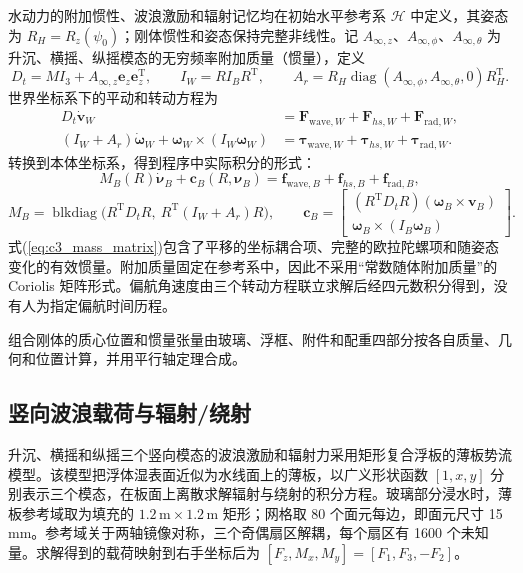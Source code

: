水动力的附加惯性、波浪激励和辐射记忆均在初始水平参考系 $\mathcal H$ 中定义，其姿态为 $R_H=R_z(\psi_0)$；刚体惯性和姿态保持完整非线性。记 $A_{\infty,z}$、$A_{\infty,\phi}$、$A_{\infty,\theta}$ 为升沉、横摇、纵摇模态的无穷频率附加质量（惯量），定义
\begin{equation}
D_t=MI_3+A_{\infty,z}\mathbf e_z\mathbf e_z^{\mathrm T},\qquad
I_W=RI_BR^{\mathrm T},\qquad
A_r=R_H\operatorname{diag}(A_{\infty,\phi},A_{\infty,\theta},0)R_H^{\mathrm T}.
\label{eq:c3_inertia}
\end{equation}
世界坐标系下的平动和转动方程为
\begin{align}
D_t\dot{\mathbf v}_W&=\mathbf F_{\mathrm{wave},W}+\mathbf F_{hs,W}+\mathbf F_{\mathrm{rad},W},\label{eq:c3_trans}\\
(I_W+A_r)\dot{\boldsymbol\omega}_W+\boldsymbol\omega_W\times(I_W\boldsymbol\omega_W)
&=\boldsymbol\tau_{\mathrm{wave},W}+\boldsymbol\tau_{hs,W}+\boldsymbol\tau_{\mathrm{rad},W}.\label{eq:c3_rot}
\end{align}
转换到本体坐标系，得到程序中实际积分的形式：
\begin{equation}
M_B(R)\dot{\boldsymbol\nu}_B+\mathbf c_B(R,\boldsymbol\nu_B)=\mathbf f_{\mathrm{wave},B}+\mathbf f_{hs,B}+\mathbf f_{\mathrm{rad},B},
\label{eq:c3_body}
\end{equation}
\begin{equation}
M_B=\operatorname{blkdiag}\big(R^{\mathrm T}D_tR,\ R^{\mathrm T}(I_W+A_r)R\big),\qquad
\mathbf c_B=\begin{bmatrix}(R^{\mathrm T}D_tR)(\boldsymbol\omega_B\times\mathbf v_B)\\ \boldsymbol\omega_B\times(I_B\boldsymbol\omega_B)\end{bmatrix}.
\label{eq:c3_mass_matrix}
\end{equation}
式(\ref{eq:c3_mass_matrix})包含了平移的坐标耦合项、完整的欧拉陀螺项和随姿态变化的有效惯量。附加质量固定在参考系中，因此不采用“常数随体附加质量”的 Coriolis 矩阵形式。偏航角速度由三个转动方程联立求解后经四元数积分得到，没有人为指定偏航时间历程。

组合刚体的质心位置和惯量张量由玻璃、浮框、附件和配重四部分按各自质量、几何和位置计算，并用平行轴定理合成。

\subsection{竖向波浪载荷与辐射/绕射}

升沉、横摇和纵摇三个竖向模态的波浪激励和辐射力采用矩形复合浮板的薄板势流模型。该模型把浮体湿表面近似为水线面上的薄板，以广义形状函数 $[1,x,y]$ 分别表示三个模态，在板面上离散求解辐射与绕射的积分方程。玻璃部分浸水时，薄板参考域取为填充的 $1.2\,\mathrm{m}\times1.2\,\mathrm{m}$ 矩形；网格取 80 个面元每边，即面元尺寸 15\,mm。参考域关于两轴镜像对称，三个奇偶扇区解耦，每个扇区有 1600 个未知量。求解得到的载荷映射到右手坐标后为 $[F_z,M_x,M_y]=[F_1,F_3,-F_2]$。

